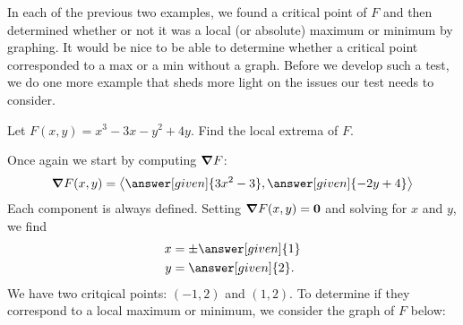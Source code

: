 \documentclass{ximera}
\begin{document}
In each of the previous two examples, we found a critical point of $F$
and then determined whether or not it was a local (or absolute)
maximum or minimum by graphing. It would be nice to be able to
determine whether a critical point corresponded to a max or a min
without a graph. Before we develop such a test, we do one more example
that sheds more light on the issues our test needs to consider.


\begin{example}
  Let $F(x,y) = x^3-3x-y^2+4y$. Find the local extrema of $F$.
  \begin{explanation}
    Once again we start by computing $\boldsymbol\nabla F$:
    \[
    \grad F(x,y) = \vector{\answer[given]{3x^2-3},\answer[given]{-2y+4}}
    \]
    Each component is always defined. Setting $\boldsymbol\nabla F(x,y) = \mathbf{0}$
    and solving for $x$ and $y$, we find
    \begin{align*}
      x &=\pm \answer[given]{1}\\
      y &= \answer[given]{2}.
    \end{align*}
    We have two critqical points: $(-1,2)$ and $(1,2)$. To determine
    if they correspond to a local maximum or minimum, we consider the
    graph of $F$ below:
    \begin{image}
    \end{image}


\end{explanation}
\end{example}
\end{document}
